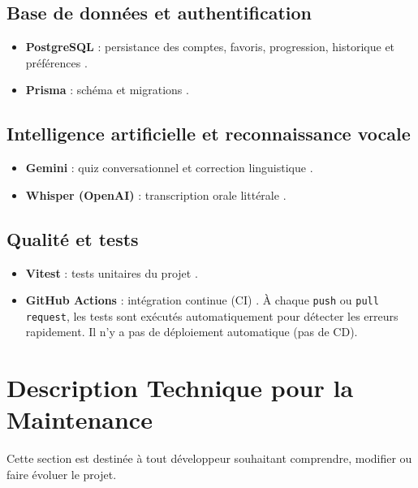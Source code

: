 \documentclass[12pt,twoside,letterpaper]{article}
\begin{document}
\subsection{Base de donn\'ees et authentification}
\begin{itemize}[leftmargin=*]
  \item \textbf{PostgreSQL} : persistance des comptes, favoris, progression, historique et pr\'ef\'erences \cite{postgresql}.
  \item \textbf{Prisma} : sch\'ema et migrations \cite{prisma}.
\end{itemize}

\subsection{Intelligence artificielle et reconnaissance vocale}
\begin{itemize}[leftmargin=*]
  \item \textbf{Gemini} : quiz conversationnel et correction linguistique \cite{gemini}.
  \item \textbf{Whisper (OpenAI)} : transcription orale litt\'erale \cite{whisper2022,openai-whisper-api}.
\end{itemize}

\subsection{Qualit\'e et tests}
\begin{itemize}[leftmargin=*]
  \item \textbf{Vitest} : tests unitaires du projet \cite{vitest}.
  \item \textbf{GitHub Actions} : int\'egration continue (CI) \cite{github-actions}.
  \`A chaque \texttt{push} ou \texttt{pull request},
  les tests sont ex\'ecut\'es automatiquement pour d\'etecter les erreurs rapidement.
  Il n'y a pas de d\'eploiement automatique (pas de CD).
\end{itemize}

\newpage

\section{Description Technique pour la Maintenance}

Cette section est destin\'ee \`a tout d\'eveloppeur souhaitant comprendre,
modifier ou faire \'evoluer le projet.
\end{document}
